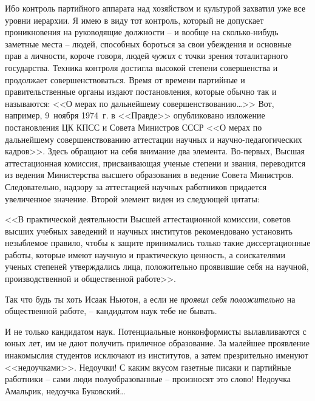 \documentclass{book}
\begin{document}
Ибо контроль партийного аппарата над хозяйством и культурой захватил уже все уровни иерархии. Я имею в виду тот контроль, который не допускает проникновения на руководящие должности -- и вообще на сколько-нибудь заметные места -- людей, способных бороться за свои убеждения и основные прав а личности, короче говоря, людей \textit{чужих} с  точки зрения тоталитарного государства. Техника контроля достигла высокой степени совершенства и продолжает совершенствоваться. Время от времени партийные и правительственные органы издают постановления, которые обычно так и называются: <<О мерах по дальнейшему совершенствованию\ldots>> Вот, например, 9~ноября 1974~г. в <<Правде>> опубликовано изложение постановления ЦК КПСС и Совета Министров СССР <<О мерах по дальнейшему совершенствованию аттестации научных и научно-педагогических кадров>>. Здесь обращают на себя внимание два элемента. Во-первых, Высшая аттестационная комиссия, присваивающая ученые степени и звания, переводится из ведения Министерства высшего образования 
в ведение 
Совета Министров. Следовательно, надзору за аттестацией научных работников придается увеличенное значение. Второй элемент виден из следующей цитаты:

<<В практической деятельности Высшей аттестационной комиссии, советов высших учебных заведений и научных институтов рекомендовано установить незыблемое правило, чтобы к защите принимались только такие диссертационные работы, которые имеют научную и практическую ценность, а соискате­лями ученых степеней утверждались лица, положительно проявившие себя на научной, производственной и общественной работе>>.

Так что будь ты хоть Исаак Ньютон, а если не \textit{проявил себя положительно} на общественной работе, -- кандидатом наук тебе не бывать.

И не только кандидатом наук. Потенциальные нонконформисты вылавливаются с юных лет, им не дают получить приличное образование. За малейшее проявление инакомыслия студентов исключают из институтов, а затем презрительно именуют <<недоучками>>. Недоучки! С каким вкусом газетные писаки и партийные работники -- сами люди полуобразованные -- произносят это слово! Недоучка Амальрик, недоучка Буковский\ldots
\end{document}
